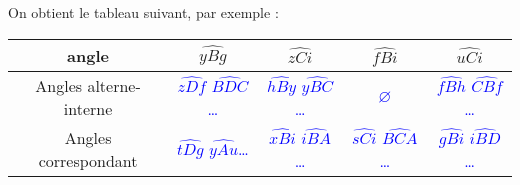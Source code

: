    On obtient le tableau suivant, par exemple : \\ \smallskip
   {
   \begin{tabular}{|C{1.8}|*{4}{C{0.85}|}}
      \hline
      angle & $\widehat{yBg}$ & $\widehat{zCi}$ & $\widehat{fBi}$ & $\widehat{uCi}$ \\
      \hline
       \footnotesize Angles alterne-interne & \textcolor{blue}{$\widehat{zDf}$ $\widehat{BDC}$\dots} & \textcolor{blue}{$\widehat{hBy}$ $\widehat{yBC}$\dots} & \textcolor{blue}{$\varnothing$} & \textcolor{blue}{$\widehat{fBh}$ $\widehat{CBf}$\dots} \\
       \hline
       \footnotesize Angles correspondant & \textcolor{blue}{$\widehat{tDg}$ $\widehat{yAu}$\dots} & \textcolor{blue}{$\widehat{xBi}$ $\widehat{iBA}$\dots} & \textcolor{blue}{$\widehat{sCi}$ $\widehat{BCA}$\dots} & \textcolor{blue}{$\widehat{gBi}$ $\widehat{iBD}$\dots} \\
       \hline
   \end{tabular}} \medskip
